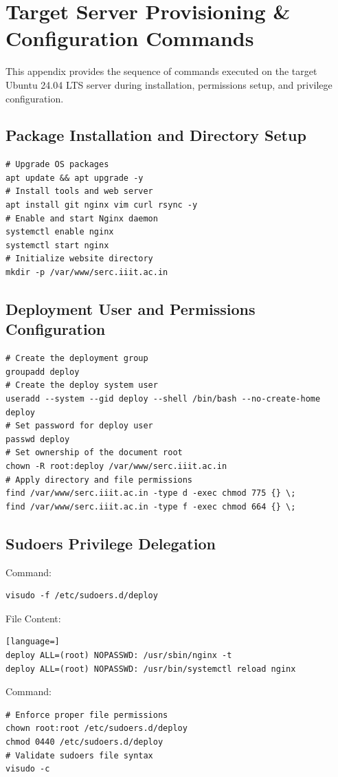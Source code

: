 \documentclass[11pt,a4paper,DIV=16,headings=normal,parskip=half]{scrartcl}
\begin{document}
\clearpage
\section{Target Server Provisioning \& Configuration Commands}
\label{sec:provisioning_commands}
This appendix provides the sequence of commands executed on the target Ubuntu 24.04 LTS server during installation, permissions setup, and privilege configuration.

\subsection{Package Installation and Directory Setup}
\begin{lstlisting}
# Upgrade OS packages
apt update && apt upgrade -y
# Install tools and web server
apt install git nginx vim curl rsync -y
# Enable and start Nginx daemon
systemctl enable nginx
systemctl start nginx
# Initialize website directory
mkdir -p /var/www/serc.iiit.ac.in
\end{lstlisting}

\subsection{Deployment User and Permissions Configuration}
\begin{lstlisting}
# Create the deployment group
groupadd deploy
# Create the deploy system user
useradd --system --gid deploy --shell /bin/bash --no-create-home deploy
# Set password for deploy user
passwd deploy
# Set ownership of the document root
chown -R root:deploy /var/www/serc.iiit.ac.in
# Apply directory and file permissions
find /var/www/serc.iiit.ac.in -type d -exec chmod 775 {} \;
find /var/www/serc.iiit.ac.in -type f -exec chmod 664 {} \;
\end{lstlisting}

\subsection{Sudoers Privilege Delegation}
Command:
\begin{lstlisting}
visudo -f /etc/sudoers.d/deploy
\end{lstlisting}
File Content:
\begin{lstlisting}[language=]
deploy ALL=(root) NOPASSWD: /usr/sbin/nginx -t
deploy ALL=(root) NOPASSWD: /usr/bin/systemctl reload nginx
\end{lstlisting}
Command:
\begin{lstlisting}
# Enforce proper file permissions
chown root:root /etc/sudoers.d/deploy
chmod 0440 /etc/sudoers.d/deploy
# Validate sudoers file syntax
visudo -c
\end{lstlisting}
\end{document}
